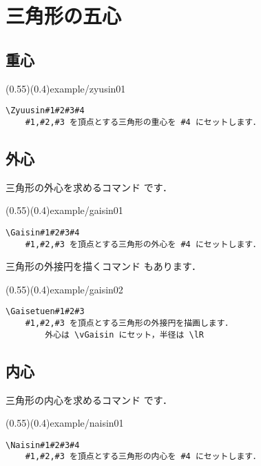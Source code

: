 \section{三角形の五心}
\subsection{重心}

\showexample[重心](0.55)(0.4){example/zyusin01}

\begin{boxnote}
\begin{verbatim}
\Zyuusin#1#2#3#4
    #1,#2,#3 を頂点とする三角形の重心を #4 にセットします．
\end{verbatim}
\end{boxnote}

\subsection{外心}
三角形の外心を求めるコマンド  です．

\showexample[外心](0.55)(0.4){example/gaisin01}

\begin{boxnote}
\begin{verbatim}
\Gaisin#1#2#3#4
    #1,#2,#3 を頂点とする三角形の外心を #4 にセットします．
\end{verbatim}
\end{boxnote}

三角形の外接円を描くコマンド  もあります．

\showexample[外接円](0.55)(0.4){example/gaisin02}

\begin{boxnote}
\begin{verbatim}
\Gaisetuen#1#2#3
    #1,#2,#3 を頂点とする三角形の外接円を描画します．
        外心は \vGaisin にセット，半径は \lR
\end{verbatim}
\end{boxnote}

\subsection{内心}
三角形の内心を求めるコマンド  です．

\showexample[内心](0.55)(0.4){example/naisin01}

\begin{boxnote}
\begin{verbatim}
\Naisin#1#2#3#4
    #1,#2,#3 を頂点とする三角形の内心を #4 にセットします．
\end{verbatim}
\end{boxnote}


